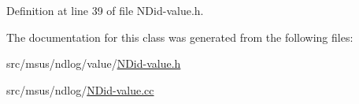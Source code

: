 Definition at line 39 of file N\-Did-\/value.\-h.



The documentation for this class was generated from the following files\-:\begin{DoxyCompactItemize}
\item 
src/msus/ndlog/value/\hyperlink{_n_did-value_8h}{N\-Did-\/value.\-h}\item 
src/msus/ndlog/\hyperlink{_n_did-value_8cc}{N\-Did-\/value.\-cc}\end{DoxyCompactItemize}
